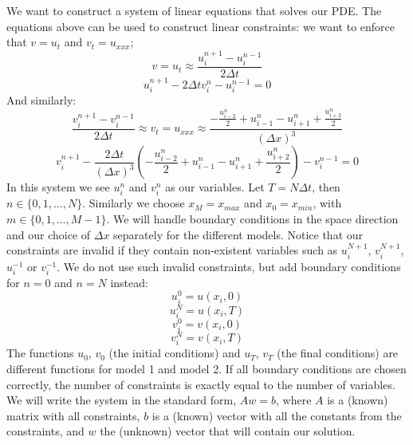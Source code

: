 \documentclass{article}
\renewcommand{\(}{\left(}
\renewcommand{\)}{\right)}
\newcommand{\uin}{u_i^n}
\newcommand{\uinp}{u_i^{n+1}}
\newcommand{\uinm}{u_i^{n-1}}
\newcommand{\uipn}{u_{i+1}^n}
\newcommand{\uimn}{u_{i-1}^n}
\newcommand{\vin}{v_i^n}
\newcommand{\vinp}{v_i^{n+1}}
\newcommand{\vinm}{v_i^{n-1}}
\newcommand{\dt}{\Delta t}
\newcommand{\dx}{\Delta x}
\newcommand{\half}[1]{\frac{{#1}}{2}}
\begin{document}
We want to construct a system of linear equations that solves our PDE. The equations above can be used to construct linear constraints: we want to enforce that $v=u_t$ and $v_t=u_{xxx}$;
$$v = u_t \approx \frac{\uinp - \uinm}{2\dt}$$
\begin{equation}
\uinp-2\dt\vin-\uinm = 0
\label{eq:uin}
\end{equation}
And similarly:
$$\frac{\vinp - \vinm}{2\dt} \approx v_t = u_{xxx} \approx \frac{-\half{u_{i-2}^n}+\uimn-\uipn+\half{u_{i+2}^n}}{(\dx)^3}$$
\begin{equation}
\vinp-\frac{2\dt}{(\dx)^3}\(-\half{u_{i-2}^n}+\uimn-\uipn+\half{u_{i+2}^n}\)-\vinm = 0
\label{eq:vin}
\end{equation}
In this system we see $\uin$ and $\vin$ as our variables. Let $T = N\dt$, then $n\in\{0,1,\dots,N\}$. Similarly we choose $x_M=x_{max}$ and $x_0=x_{min}$, with $m \in \{0,1,\dots,M-1\}$. We will handle boundary conditions in the space direction and our choice of $\dx$ separately for the different models.
Notice that our constraints are invalid if they contain non-existent variables such as $u_i^{N+1}$, $v_i^{N+1}$, $u_i^{-1}$ or $v_i^{-1}$. We do not use such invalid constraints, but add boundary conditions for $n=0$ and $n=N$ instead:
\begin{equation}
u_i^0 = u(x_i, 0)
\label{eq:ui0}
\end{equation}
\begin{equation}
u_i^N = u(x_i, T)
\label{eq:uiN}
\end{equation}
\begin{equation}
v_i^0 = v(x_i, 0)
\label{eq:vi0}
\end{equation}
\begin{equation}
v_i^N = v(x_i, T)
\label{eq:viN}
\end{equation}
The functions $u_0$, $v_0$ (the initial conditions)  and $u_T$, $v_T$ (the final conditions) are different functions for model 1 and model 2.
If all boundary conditions are chosen correctly, the number of constraints is exactly equal to the number of variables. We will write the system in the standard form, $A w = b$, where $A$ is a (known) matrix with all constraints, $b$ is a (known) vector with all the constants from the constraints, and $w$ the (unknown) vector that will contain our solution.
\end{document}
